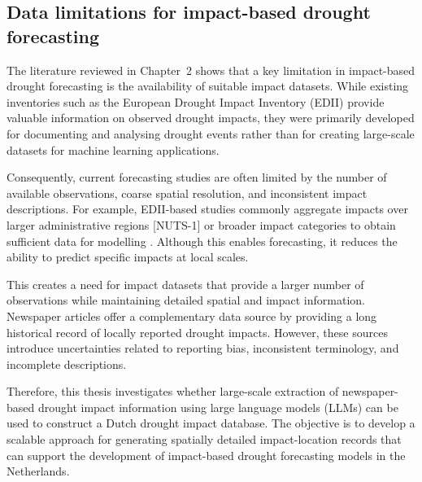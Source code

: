 

\subsection{Data limitations for impact-based drought forecasting}

The literature reviewed in Chapter~2 shows that a key limitation in impact-based drought forecasting is the availability of suitable impact datasets. While existing inventories such as the European Drought Impact Inventory (EDII) provide valuable information on observed drought impacts, they were primarily developed for documenting and analysing drought events rather than for creating large-scale datasets for machine learning applications.

Consequently, current forecasting studies are often limited by the number of available observations, coarse spatial resolution, and inconsistent impact descriptions. For example, EDII-based studies commonly aggregate impacts over larger administrative regions [NUTS-1] or broader impact categories to obtain sufficient data for modelling \cite{Sutanto2019Moving, Blauhut2015Towards}. Although this enables forecasting, it reduces the ability to predict specific impacts at local scales.

This creates a need for impact datasets that provide a larger number of observations while maintaining detailed spatial and impact information. Newspaper articles offer a complementary data source by providing a long historical record of locally reported drought impacts. However, these sources introduce uncertainties related to reporting bias, inconsistent terminology, and incomplete descriptions.

Therefore, this thesis investigates whether large-scale extraction of newspaper-based drought impact information using large language models (LLMs) can be used to construct a Dutch drought impact database. The objective is to develop a scalable approach for generating spatially detailed impact-location records that can support the development of impact-based drought forecasting models in the Netherlands.